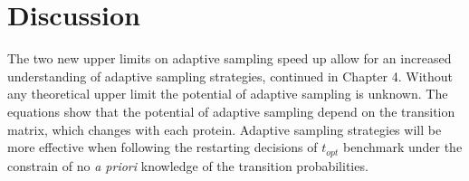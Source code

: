 \section{\label{sec:methods}Discussion}

The two new upper limits on adaptive sampling speed up allow for an increased understanding of adaptive sampling strategies, continued in Chapter 4. Without any theoretical upper limit the potential of adaptive sampling is unknown. The equations show that the potential of adaptive sampling depend on the transition matrix, which changes with each protein. Adaptive sampling strategies will be more effective when following the restarting decisions of $t_{opt}$ benchmark under the constrain of no \emph{a priori} knowledge of the transition probabilities.



















